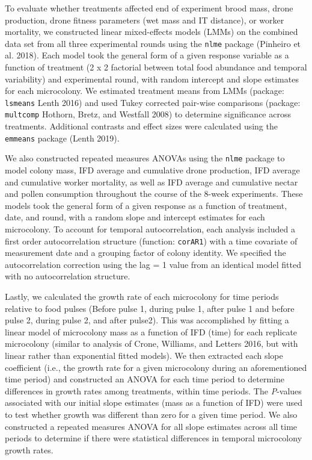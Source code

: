 \documentclass[11pt,]{article}
\begin{document}
To evaluate whether treatments affected end of experiment brood mass,
drone production, drone fitness parameters (wet mass and IT distance),
or worker mortality, we constructed linear mixed-effects models (LMMs)
on the combined data set from all three experimental rounds using the
\texttt{nlme} package (Pinheiro et al. 2018). Each model took the
general form of a given response variable as a function of treatment (2
x 2 factorial between total food abundance and temporal variability) and
experimental round, with random intercept and slope estimates for each
microcolony. We estimated treatment means from LMMs (package:
\texttt{lsmeans} Lenth 2016) and used Tukey corrected pair-wise
comparisons (package: \texttt{multcomp} Hothorn, Bretz, and Westfall
2008) to determine significance across treatments. Additional contrasts
and effect sizes were calculated using the \texttt{emmeans} package
(Lenth 2019).

We also constructed repeated measures ANOVAs using the \texttt{nlme}
package to model colony mass, IFD average and cumulative drone
production, IFD average and cumulative worker mortality, as well as IFD
average and cumulative nectar and pollen consumption throughout the
course of the 8-week experiments. These models took the general form of
a given response as a function of treatment, date, and round, with a
random slope and intercept estimates for each microcolony. To account
for temporal autocorrelation, each analysis included a first order
autocorrelation structure (function: \texttt{corAR1}) with a time
covariate of measurement date and a grouping factor of colony identity.
We specified the autocorrelation correction using the lag = 1 value from
an identical model fitted with no autocorrelation structure.

Lastly, we calculated the growth rate of each microcolony for time
periods relative to food pulses (Before pulse 1, during pulse 1, after
pulse 1 and before pulse 2, during pulse 2, and after pulse2). This was
accomplished by fitting a linear model of microcolony mass as a function
of IFD (time) for each replicate microcolony (similar to analysis of
Crone, Williams, and Letters 2016, but with linear rather than
exponential fitted models). We then extracted each slope coefficient
(i.e., the growth rate for a given microcolony during an aforementioned
time period) and constructed an ANOVA for each time period to determine
differences in growth rates among treatments, within time periods. The
\emph{P}-values associated with our initial slope estimates (mass as a
function of IFD) were used to test whether growth was different than
zero for a given time period. We also constructed a repeated measures
ANOVA for all slope estimates across all time periods to determine if
there were statistical differences in temporal microcolony growth rates.
\end{document}
